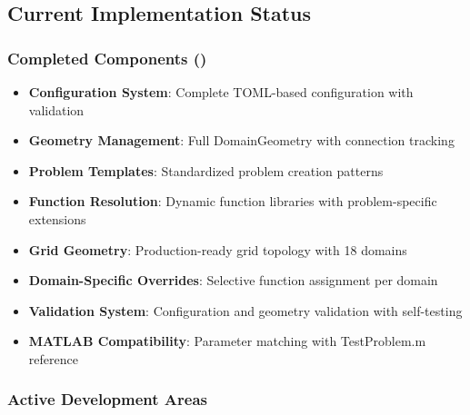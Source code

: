 \subsection{Current Implementation Status}

\subsubsection{Completed Components (\textcolor{green}{\checkmark})}

\begin{itemize}
    \item \textbf{Configuration System}: Complete TOML-based configuration with validation
    \item \textbf{Geometry Management}: Full DomainGeometry with connection tracking
    \item \textbf{Problem Templates}: Standardized problem creation patterns
    \item \textbf{Function Resolution}: Dynamic function libraries with problem-specific extensions
    \item \textbf{Grid Geometry}: Production-ready grid topology with 18 domains
    \item \textbf{Domain-Specific Overrides}: Selective function assignment per domain
    \item \textbf{Validation System}: Configuration and geometry validation with self-testing
    \item \textbf{MATLAB Compatibility}: Parameter matching with TestProblem.m reference
\end{itemize}

\subsubsection{Active Development Areas}

